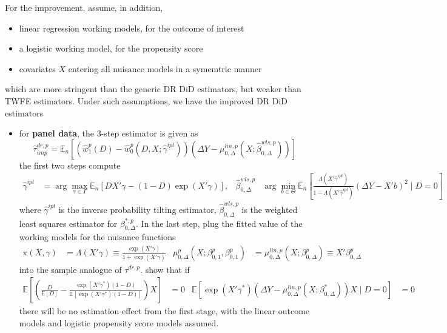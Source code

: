 \documentclass[twoside]{article}
\begin{document}
For the improvement, \citet{sant2020doubly} assume, in addition, 
\begin{itemize}
    \item linear regression working models, for the outcome of interest
    \item a logistic working model, for the propensity score
    \item covariates $X$ entering all nuisance models in a symemtric manner 
\end{itemize}
which are more stringent than the generic DR DiD estimators, but weaker than TWFE estimators. Under such assumptions, we have the improved DR DiD estimators 
\begin{itemize}
    \item for \textbf{panel data}, the 3-step estimator is given as 
    \begin{equation*}
        \hat{\tau}^{dr,p}_{imp} = \mathbb{E}_n\left[ \left(\hat{w}^p_1(D)-\hat{w}^p_0 \left(D,X;\hat{\gamma}^{ipt}\right)\right) \left( \Delta Y-\mu^{lin,p}_{0,\Delta} \left(X;\hat{\beta}^{wls,p}_{0,\Delta}\right) \right) \right]
    \end{equation*}
    the first two steps compute 
    \begin{align*}
        \hat{\gamma}^{ipt} &= \arg\max_{\gamma\in \Gamma}\mathbb{E}_n\left[DX'\gamma -(1-D)\exp(X'\gamma)\right], & \hat{\beta}^{wls,p}_{0,\Delta} & \arg\min_{b\in\Theta}\mathbb{E}_n \left[ \frac{\Lambda\left(X'\hat{\gamma}^{ipt}\right)}{1-\Lambda\left(X'\hat{\gamma}^{ipt}\right)} \left(\Delta Y-X'b\right)^2 \mid D=0 \right]
    \end{align*}
    where $\hat{\gamma}^{ipt}$ is the inverse probability tilting estimator, $\hat{\beta}^{wls,p}_{0,\Delta}$ is the weighted least squares estimator for $\beta^{*,p}_{0,\Delta}$.
    In the last step, plug the fitted value of the working models for the nuisance functions 
    \begin{align*}
        \pi(X,\gamma) &= \Lambda\left(X'\gamma\right) \equiv \frac{\exp(X'\gamma)}{1+\exp (X'\gamma)} & \mu^p_{0,\Delta}\left(X;\beta^p_{0,1},\beta^p_{0,1}\right)&= \mu^{lin,p}_{0,\Delta}\left(X;\beta^p_{0,\Delta}\right)\equiv X'\beta^p_{0,\Delta}
    \end{align*}
    into the sample analogue of $\tau^{dr,p}$. \citet{sant2020doubly} show that if 
    \begin{align*}
        \mathbb{E}\left[ \left(\frac{D}{\mathbb{E}\left[D\right]} - \frac{\exp(X'\gamma^*)(1-D)}{\mathbb{E}\left[\exp(X'\gamma^*)(1-D)\right]}\right) X \right] &= 0 & \mathbb{E}\left[\exp (X'\gamma^*) \left(\Delta Y-\mu^{lin,p}_{0,\Delta}\left(X;\beta^*_{0,\Delta}\right)\right)X \mid D=0 \right] &=0
    \end{align*}
    there will be no estimation effect from the first stage, with the linear outcome models and logistic propensity score models assumed. 
    

\end{itemize}
\end{document}
